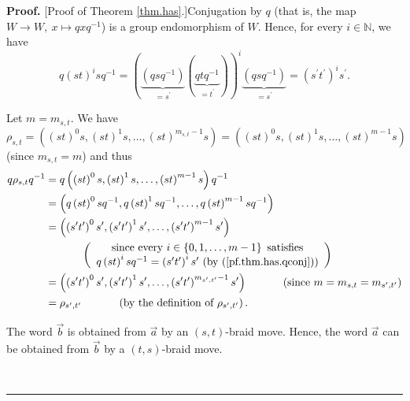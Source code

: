 \documentclass[numbers=enddot,12pt,final,onecolumn,notitlepage,abstracton]{scrartcl}%
\theoremstyle{definition}
\newenvironment{proof}[1][Proof]{\noindent\textbf{#1.} }{\ \rule{0.5em}{0.5em}}
\begin{document}
\begin{proof}
[Proof of Theorem \ref{thm.has}.]Conjugation by $q$ (that is, the map
$W\rightarrow W,\ x\mapsto qxq^{-1}$) is a group endomorphism of $W$. Hence,
for every $i\in\mathbb{N}$, we have%
\begin{equation}
q\left(  st\right)  ^{i}sq^{-1}=\left(  \underbrace{\left(  qsq^{-1}\right)
}_{=s^{\prime}}\left(  \underbrace{qtq^{-1}}_{=t^{\prime}}\right)  \right)
^{i}\underbrace{\left(  qsq^{-1}\right)  }_{=s^{\prime}}=\left(  s^{\prime
}t^{\prime}\right)  ^{i}s^{\prime}. \label{pf.thm.has.qconj}%
\end{equation}


Let $m=m_{s,t}$. We have%
\[
\rho_{s,t}=\left(  \left(  st\right)  ^{0}s,\left(  st\right)  ^{1}%
s,\ldots,\left(  st\right)  ^{m_{s,t}-1}s\right)  =\left(  \left(  st\right)
^{0}s,\left(  st\right)  ^{1}s,\ldots,\left(  st\right)  ^{m-1}s\right)
\]
(since $m_{s,t}=m$) and thus%
\begin{align*}
q\rho_{s,t}q^{-1}  &  =q\left(  \left(  st\right)  ^{0}s,\left(  st\right)
^{1}s,\ldots,\left(  st\right)  ^{m-1}s\right)  q^{-1}\\
&  =\left(  q\left(  st\right)  ^{0}sq^{-1},q\left(  st\right)  ^{1}%
sq^{-1},\ldots,q\left(  st\right)  ^{m-1}sq^{-1}\right) \\
&  =\left(  \left(  s^{\prime}t^{\prime}\right)  ^{0}s^{\prime},\left(
s^{\prime}t^{\prime}\right)  ^{1}s^{\prime},\ldots,\left(  s^{\prime}%
t^{\prime}\right)  ^{m-1}s^{\prime}\right) \\
&  \ \ \ \ \ \ \ \ \ \ \left(
\begin{array}
[c]{c}%
\text{since every }i\in\left\{  0,1,\ldots,m-1\right\}  \text{ satisfies}\\
q\left(  st\right)  ^{i}sq^{-1}=\left(  s^{\prime}t^{\prime}\right)
^{i}s^{\prime}\text{ (by (\ref{pf.thm.has.qconj}))}%
\end{array}
\right) \\
&  =\left(  \left(  s^{\prime}t^{\prime}\right)  ^{0}s^{\prime},\left(
s^{\prime}t^{\prime}\right)  ^{1}s^{\prime},\ldots,\left(  s^{\prime}%
t^{\prime}\right)  ^{m_{s^{\prime},t^{\prime}}-1}s^{\prime}\right)
\ \ \ \ \ \ \ \ \ \ \left(  \text{since }m=m_{s,t}=m_{s^{\prime},t^{\prime}%
}\right) \\
&  =\rho_{s^{\prime},t^{\prime}}\ \ \ \ \ \ \ \ \ \ \left(  \text{by the
definition of }\rho_{s^{\prime},t^{\prime}}\right)  .
\end{align*}


The word $\overrightarrow{b}$ is obtained from $\overrightarrow{a}$ by an
$\left(  s,t\right)  $-braid move. Hence, the word $\overrightarrow{a}$ can be
obtained from $\overrightarrow{b}$ by a $\left(  t,s\right)  $-braid move.


\end{proof}
\end{document}
